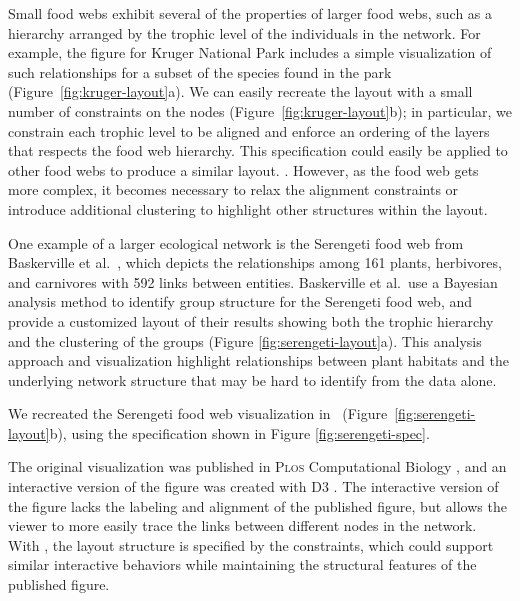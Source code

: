 Small food webs exhibit several of the properties of larger food webs, such
as a hierarchy arranged by the trophic level of the individuals in the
network. For example, the figure for Kruger National Park includes a simple visualization
of such relationships for a subset of the species found in the park
(Figure~\ref{fig:kruger-layout}a). We can easily recreate the layout with a
small number of constraints on the nodes (Figure~\ref{fig:kruger-layout}b);
in particular, we constrain each trophic level to be aligned and enforce an
ordering of the layers that respects the food web hierarchy. This
\projectname specification could easily be applied to other food webs to
produce a similar layout. . However, as the food
web gets more complex, it becomes necessary to relax the alignment
constraints or introduce additional clustering to highlight other
structures within the layout.

One example of a larger ecological network is the Serengeti food web from
Baskerville et al.~\cite{baskerville2011spatial}, which depicts the
relationships among 161 plants, herbivores, and carnivores with 592 links
between entities. Baskerville et al.\ use a Bayesian analysis method to
identify group structure for the Serengeti food web, and provide a
customized layout of their results showing both the trophic hierarchy and
the clustering of the groups (Figure \ref{fig:serengeti-layout}a). This
analysis approach and visualization highlight relationships between plant
habitats and the underlying network structure that may be hard to identify
from the data alone.

We recreated the Serengeti food web visualization in
\projectname~(Figure~\ref{fig:serengeti-layout}b), using the specification
shown in Figure \ref{fig:serengeti-spec}.  

The original visualization was published in \textsc{Plos} Computational
Biology \cite{baskerville2011spatial}, and an interactive version of the
figure was created with D3 \cite{baskerville2011interactive}. The
interactive version of the figure lacks the labeling and alignment of the
published figure, but allows the viewer to more easily trace the links
between different nodes in the network. With \projectname, the layout
structure is specified by the constraints, which could support similar
interactive behaviors while maintaining the structural features of the
published figure.

